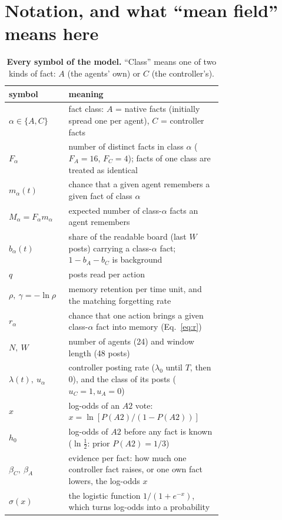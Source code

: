 \documentclass[10pt,a4paper]{article}
\begin{document}
\section{Notation, and what ``mean field'' means here}
\label{sec:notation}

\begin{table}[h]
\centering\small
\caption{\textbf{Every symbol of the model.} ``Class'' means one of two kinds of fact: $A$ (the agents' own) or $C$
(the controller's).}
\label{tab:notation}
\begin{tabular}{@{}l p{0.72\linewidth}@{}}\toprule
symbol & meaning\\\midrule
$\alpha\in\{A,C\}$ & fact class: $A$ = native facts (initially spread one per agent), $C$ = controller facts\\
$F_\alpha$ & number of distinct facts in class $\alpha$ ($F_A=16$, $F_C=4$); facts of one class are treated as identical\\
$m_\alpha(t)$ & chance that a given agent remembers a given fact of class $\alpha$\\
$M_\alpha=F_\alpha m_\alpha$ & expected number of class-$\alpha$ facts an agent remembers\\
$b_\alpha(t)$ & share of the readable board (last $W$ posts) carrying a class-$\alpha$ fact; $1-b_A-b_C$ is background\\
$q$ & posts read per action\\
$\rho,\ \gamma=-\ln\rho$ & memory retention per time unit, and the matching forgetting rate\\
$r_\alpha$ & chance that one action brings a given class-$\alpha$ fact into memory (Eq.~\ref{eq:r})\\
$N,\ W$ & number of agents (24) and window length (48 posts)\\
$\lambda(t),\ u_\alpha$ & controller posting rate ($\lambda_0$ until $T$, then 0), and the class of its posts ($u_C=1,u_A=0$)\\
$x$ & log-odds of an $A2$ vote: $x=\ln[P(A2)/(1-P(A2))]$\\
$h_0$ & log-odds of $A2$ before any fact is known ($\ln\tfrac12$: prior $P(A2)=1/3$)\\
$\beta_C,\ \beta_A$ & evidence per fact: how much one controller fact raises, or one own fact lowers, the log-odds $x$\\
$\sigma(x)$ & the logistic function $1/(1+e^{-x})$, which turns log-odds into a probability\\

\end{tabular}
\end{table}
\end{document}
